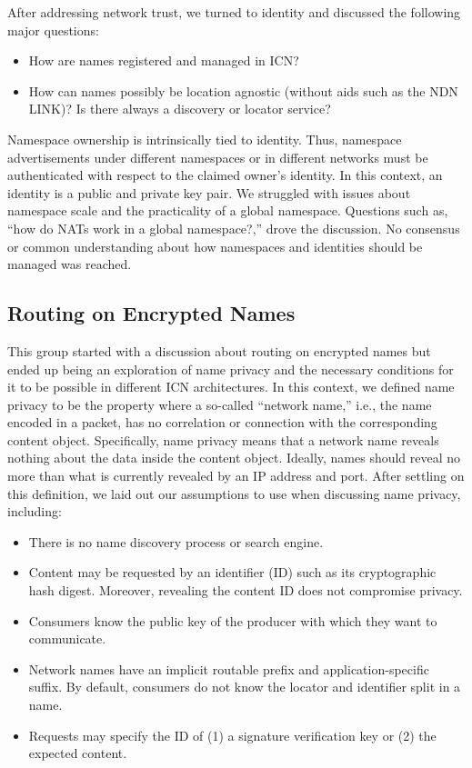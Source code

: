 After addressing network trust, we turned to identity and discussed the following major questions:
%
\begin{itemize}
\item How are names registered and managed in ICN?
\item How can names possibly be location agnostic (without aids such as the NDN LINK)? Is there always a discovery or locator service?
\end{itemize}
%
Namespace ownership is intrinsically tied to identity. Thus, namespace advertisements under different namespaces or in different networks must be authenticated with respect to the claimed owner's identity. In this context, an identity is a public and private key pair. We struggled with issues about namespace scale and the practicality of a global namespace. Questions such as, ``how do NATs work in a global namespace?,'' drove the discussion. No consensus or common understanding about how namespaces and identities should be managed was reached.


\subsection{Routing on Encrypted Names}
This group started with a discussion about routing on encrypted names but ended up being an exploration of name privacy and the necessary conditions for it to be possible in different ICN architectures. In this context, we defined name privacy to be the property where a so-called ``network name,'' i.e., the name encoded in a packet, has no correlation or connection with the corresponding content object. Specifically, name privacy means that a network name reveals nothing about the data inside the content object. Ideally, names should reveal no more than what is currently revealed by an IP address and port. After settling on this definition, we laid out our assumptions to use when discussing name privacy, including:

\begin{itemize}
\item There is no name discovery process or search engine.
\item Content may be requested by an identifier (ID) such as its cryptographic hash digest. Moreover, revealing the content ID does not compromise privacy.
\item Consumers know the public key of the producer with which they want to communicate.
\item Network names have an implicit routable prefix and application-specific suffix. By default, consumers do not know the locator and identifier split in a name.
\item Requests may specify the ID of (1) a signature verification key or (2) the expected content.
\end{itemize}

